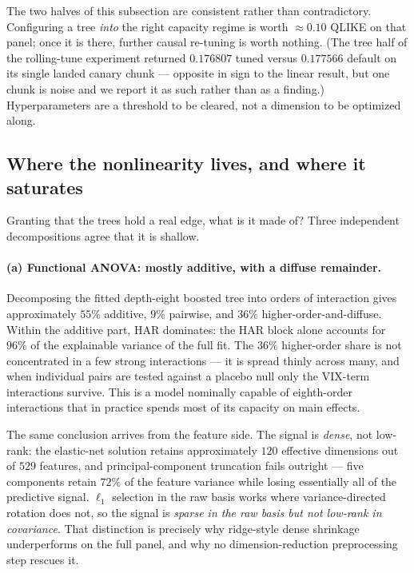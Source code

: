 The two halves of this subsection are consistent rather than contradictory.
Configuring a tree \emph{into} the right capacity regime is worth
$\approx 0.10$ QLIKE on that panel; once it is there, further causal re-tuning is
worth nothing. (The tree half of the rolling-tune experiment returned
$0.176807$ tuned versus $0.177566$ default on its single landed canary chunk ---
opposite in sign to the linear result, but one chunk is noise and we report it as
such rather than as a finding.) Hyperparameters are a threshold to be cleared,
not a dimension to be optimized along.

\subsection{Where the nonlinearity lives, and where it saturates}
\label{sec:linvsnonlin_saturation}

Granting that the trees hold a real edge, what is it made of? Three independent
decompositions agree that it is shallow.

\paragraph{(a) Functional ANOVA: mostly additive, with a diffuse remainder.}
Decomposing the fitted depth-eight boosted tree into orders of interaction gives
approximately $55\%$ additive, $9\%$ pairwise, and $36\%$
higher-order-and-diffuse. Within the additive part, HAR dominates: the HAR block
alone accounts for $96\%$ of the explainable variance of the full fit. The $36\%$
higher-order share is not concentrated in a few strong interactions --- it is
spread thinly across many, and when individual pairs are tested against a placebo
null only the VIX-term interactions survive. This is a model nominally capable of
eighth-order interactions that in practice spends most of its capacity on main
effects.

The same conclusion arrives from the feature side. The signal is \emph{dense},
not low-rank: the elastic-net solution retains approximately $120$ effective
dimensions out of $529$ features, and principal-component truncation fails
outright --- five components retain $72\%$ of the feature variance while losing
essentially all of the predictive signal. $\ell_1$ selection in the raw basis
works where variance-directed rotation does not, so the signal is \emph{sparse in
the raw basis but not low-rank in covariance}. That distinction is precisely why
ridge-style dense shrinkage underperforms on the full panel, and why no
dimension-reduction preprocessing step rescues it.

